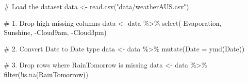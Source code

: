 \documentclass[
  letterpaper,
  DIV=11,
  numbers=noendperiod]{scrartcl}
\newenvironment{Shaded}{\begin{snugshade}}{\end{snugshade}}
\newcommand{\AttributeTok}[1]{\textcolor[rgb]{0.40,0.45,0.13}{#1}}
\newcommand{\CommentTok}[1]{\textcolor[rgb]{0.37,0.37,0.37}{#1}}
\newcommand{\FunctionTok}[1]{\textcolor[rgb]{0.28,0.35,0.67}{#1}}
\newcommand{\NormalTok}[1]{\textcolor[rgb]{0.00,0.23,0.31}{#1}}
\newcommand{\OtherTok}[1]{\textcolor[rgb]{0.00,0.23,0.31}{#1}}
\newcommand{\SpecialCharTok}[1]{\textcolor[rgb]{0.37,0.37,0.37}{#1}}
\newcommand{\StringTok}[1]{\textcolor[rgb]{0.13,0.47,0.30}{#1}}
\begin{document}
\begin{Shaded}
\begin{Highlighting}[]
\CommentTok{\# Load the dataset}
\NormalTok{data }\OtherTok{\textless{}{-}} \FunctionTok{read.csv}\NormalTok{(}\StringTok{"data/weatherAUS.csv"}\NormalTok{)}
\end{Highlighting}
\end{Shaded}

\begin{Shaded}
\begin{Highlighting}[]
\CommentTok{\# 1. Drop high{-}missing columns}
\NormalTok{data }\OtherTok{\textless{}{-}}\NormalTok{ data }\SpecialCharTok{\%\textgreater{}\%}
  \FunctionTok{select}\NormalTok{(}\SpecialCharTok{{-}}\NormalTok{Evaporation, }\SpecialCharTok{{-}}\NormalTok{Sunshine, }\SpecialCharTok{{-}}\NormalTok{Cloud9am, }\SpecialCharTok{{-}}\NormalTok{Cloud3pm)}
\end{Highlighting}
\end{Shaded}

\begin{Shaded}
\begin{Highlighting}[]
\CommentTok{\# 2. Convert \textquotesingle{}Date\textquotesingle{} to Date type}
\NormalTok{data }\OtherTok{\textless{}{-}}\NormalTok{ data }\SpecialCharTok{\%\textgreater{}\%}
  \FunctionTok{mutate}\NormalTok{(}\AttributeTok{Date =} \FunctionTok{ymd}\NormalTok{(Date))}
\end{Highlighting}
\end{Shaded}

\begin{Shaded}
\begin{Highlighting}[]
\CommentTok{\# 3. Drop rows where \textquotesingle{}RainTomorrow\textquotesingle{} is missing}
\NormalTok{data }\OtherTok{\textless{}{-}}\NormalTok{ data }\SpecialCharTok{\%\textgreater{}\%}
  \FunctionTok{filter}\NormalTok{(}\SpecialCharTok{!}\FunctionTok{is.na}\NormalTok{(RainTomorrow))}
\end{Highlighting}
\end{Shaded}
\end{document}
